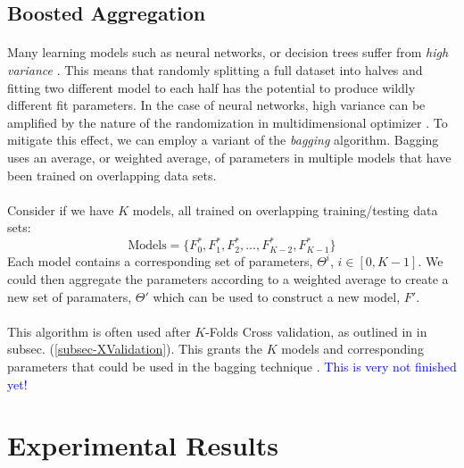 \documentclass[12pt,letterpaper]{article}
\begin{document}
\subsection{Boosted Aggregation}
\label{subsec-Bagging}

\paragraph*{}Many learning models such as neural networks, or decision trees suffer from \textit{high variance} \cite{James}. This means that randomly splitting a full dataset into halves and fitting two different model to each half has the potential to produce wildly different fit parameters. In the case of neural networks, high variance can be amplified by the nature of the randomization in multidimensional optimizer \cite{Geron}. To mitigate this effect, we can employ a variant of the \textit{bagging} algorithm. Bagging uses an average, or weighted average, of parameters in multiple models that have been trained on overlapping data sets.

\paragraph*{}Consider if we have $K$ models, all trained on overlapping training/testing data sets:
\begin{equation}
\text{Models} = \Big\{ F^*_{0} , F^*_{1} , F^*_{2} , ... , F^*_{K-2} , F^*_{K-1} \Big\}
\end{equation}
Each model contains a corresponding set of parameters, $\Theta^{i}$, $i \in [0,K-1]$.
We could then aggregate the parameters according to a weighted average to create a new set of paramaters, $\Theta '$ which can be used to construct a new model, $F'$.

\paragraph*{}This algorithm is often used after $K$-Folds Cross validation, as outlined in in subsec. (\ref{subsec-XValidation}). This grants the $K$ models and corresponding parameters that could be used in the bagging technique \cite{James}. \textcolor{blue}{This is very not finished yet!}


\newpage
\section{Experimental Results}
\label{sec-Results}
\end{document}
